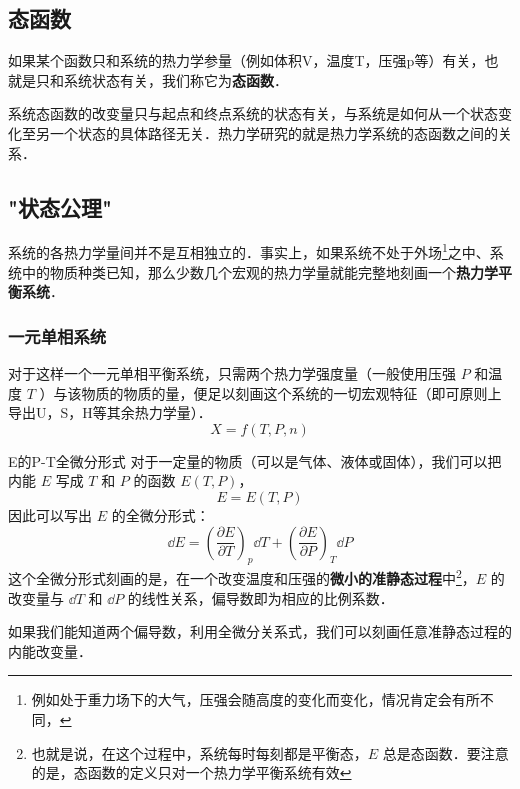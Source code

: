 
\subsection{态函数}
如果某个函数只和系统的热力学参量（例如体积V，温度T，压强p等）有关，也就是只和系统状态有关，我们称它为\textbf{态函数}．

系统态函数的改变量只与起点和终点系统的状态有关，与系统是如何从一个状态变化至另一个状态的具体路径无关．热力学研究的就是热力学系统的态函数之间的关系．

\subsection{"状态公理"}
系统的各热力学量间并不是互相独立的．事实上，如果系统不处于外场\footnote{例如处于重力场下的大气，压强会随高度的变化而变化，情况肯定会有所不同，}之中、系统中的物质种类已知，那么少数几个宏观的热力学量就能完整地刻画一个\textbf{热力学平衡系统}．

\subsubsection{一元单相系统}
对于这样一个一元单相平衡系统，只需两个热力学强度量（一般使用压强 $P$ 和温度 $T$ ）与该物质的物质的量，便足以刻画这个系统的一切宏观特征（即可原则上导出U，S，H等其余热力学量）．
\begin{equation}
X=f(T,P,n)
\end{equation}

\begin{example}{E的P-T全微分形式}
对于一定量的物质（可以是气体、液体或固体），我们可以把内能 $E$ 写成 $T$ 和 $P$ 的函数 $E(T,P)$，
\begin{equation}
E=E(T,P)
\end{equation}
因此可以写出 $E$ 的全微分形式：
\begin{equation}
\dd E=\left(\frac{\partial E}{\partial T}\right)_p \dd T + \left(\frac{\partial E}{\partial P}\right)_T \dd P
\end{equation}
这个全微分形式刻画的是，在一个改变温度和压强的\textbf{微小的准静态过程}中\footnote{也就是说，在这个过程中，系统每时每刻都是平衡态，$E$ 总是态函数．要注意的是，态函数的定义只对一个热力学平衡系统有效}，$E$ 的改变量与 $\dd T$ 和 $\dd P$ 的线性关系，偏导数即为相应的比例系数．

如果我们能知道两个偏导数，利用全微分关系式，我们可以刻画任意准静态过程的内能改变量．
\end{example}

